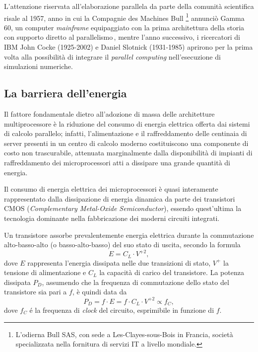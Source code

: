L'attenzione riservata all'elaborazione parallela da parte della comunit\`a scientifica risale al 1957, anno in cui la Compagnie des Machines Bull
\footnote{L'odierna Bull SAS, con sede a Les-Clayes-sous-Bois in Francia, societ\`a specializzata nella fornitura di servizi IT a livello mondiale.} annunci\`o Gamma 60, un computer \textit{mainframe}
equipaggiato con la prima architettura della storia con supporto diretto
al parallelismo\,\cite{Smotherman}, mentre l'anno successivo, i ricercatori di IBM John
Cocke (1925-2002) e Daniel Slotnick (1931-1985) aprirono per la prima volta alla
possibilit\`a di integrare il \textit{parallel computing} nell'esecuzione di simulazioni numeriche.

\subsection{La barriera dell'energia}
\nocite{Spirito2021}
Il fattore fondamentale dietro all'adozione di massa delle architetture multiprocessore \`e la riduzione del consumo di energia elettrica offerta dai sistemi di calcolo parallelo; infatti, l'alimentazione e il raffreddamento delle centinaia di server presenti in un centro di calcolo moderno costituiscono una componente di costo non trascurabile, attenuata marginalmente dalla disponibilit\`a di impianti di raffreddamento dei microprocessori atti a dissipare una grande quantit\`a di energia.

Il consumo di energia elettrica dei microprocessori \`e quasi interamente rappresentato dalla dissipazione di energia dinamica da parte dei transistori CMOS (\textit{Complementary Metal-Oxide Semiconductor}), essendo quest'ultima la tecnologia dominante nella fabbricazione dei moderni circuiti integrati.

Un transistore assorbe prevalentemente energia elettrica durante la commutazione alto-basso-alto (o basso-alto-basso) del suo stato di uscita, secondo la formula
\begin{equation}
    E = C_{L} \cdot V^{+2},
\end{equation}
dove $E$ rappresenta l'energia dissipata nelle due transizioni di stato, $V^{+}$ la tensione di alimentazione e $C_{L}$ la capacit\`a di carico del transistore.\newline
La potenza dissipata $P_{D}$, assumendo che la frequenza di commutazione dello stato del transistore sia pari a $f$, \`e quindi data da
\begin{equation}
    P_{D} = f \cdot E = f \cdot C_{L} \cdot V^{+2} \propto f_{C},
\end{equation}
dove $f_{C}$ \'e la frequenza di \textit{clock} del circuito, esprimibile in funzione di $f$.

